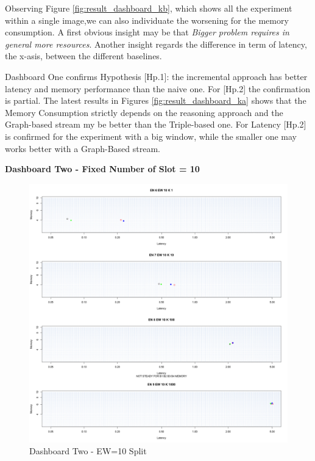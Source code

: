 Observing Figure \ref{fig:result_dashboard_kb}, which shows all the experiment within a single image,we can also individuate the worsening for the memory consumption. A first obvious insight may be that \textit{Bigger problem requires in general more resources}. Another insight regards the difference in term of latency, the x-asis, between the different baselines.

Dashboard One confirms Hypothesis [Hp.1]: the incremental approach has better latency and memory performance than the naive one. For [Hp.2] the confirmation is partial. The latest results in Figures \ref{fig:result_dashboard_ka} shows that the Memory Consumption strictly depends on the reasoning approach and the Graph-based stream my be better than the Triple-based one. For Latency [Hp.2] is confirmed for the experiment with a big window, while the smaller one may works better with a Graph-Based stream.


\textbf{Dashboard Two - Fixed Number of Slot = 10}


\begin{figure}[htb]
	\centering
	\includegraphics[width=0.90\linewidth]{images/dashboard-2-split}	
	\caption{Dashboard Two - EW=10 Split} 
	\label{fig:result_dashboard_ewa}
\end{figure}

